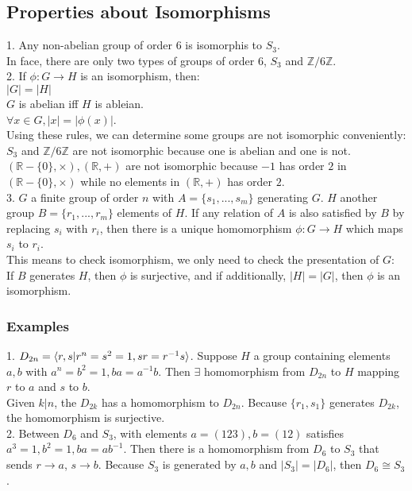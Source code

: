 \documentclass{article}
\begin{document}
\subsection{Properties about Isomorphisms}
\begin{addmargin}[1em]{0em}
1. Any non-abelian group of order $6$ is isomorphis to $S_3$.\\
In face, there are only two types of groups of order $6$, $S_3$ and $\mathbb{Z}/6\mathbb{Z}$.\\
2. If $\phi: G \rightarrow H$ is an isomorphism, then:\\
$|G| = |H|$\\
$G$ is abelian iff $H$ is ableian.\\
$\forall x \in G, |x| = |\phi(x)|$.\\
Using these rules, we can determine some groups are not isomorphic conveniently:\\
$S_3$ and $\mathbb{Z}/6\mathbb{Z}$ are not isomorphic because one is abelian and one is not.\\
$(\mathbb{R}-\{0\}, \times), (\mathbb{R}, +)$ are not isomorphic because $-1$ has order $2$ in $(\mathbb{R}-\{0\}, \times)$ while no elements in $(\mathbb{R}, +)$ has order $2$.\\
3. $G$ a finite group of order $n$ with $A=\{s_1, ..., s_m\}$ generating $G$. $H$ another group $B=\{r_1, ..., r_m\}$ elements of $H$. If any relation of $A$ is also satisfied by $B$ by replacing $s_i$ with $r_i$, then there is a unique homomorphism $\phi:G \rightarrow H$ which maps $s_i$ to $r_i$.\\
This means to check isomorphism, we only need to check the presentation of $G$:\\
If $B$ generates $H$, then $\phi$ is surjective, and if additionally, $|H| = |G|$, then $\phi$ is an isomorphism.\\
\subsubsection{Examples}
1. $D_{2n} = \braket{r,s|r^n=s^2=1, sr=r^{-1}s}$. Suppose $H$ a group containing elements $a,b$ with $a^n=b^2=1,ba=a^{-1}b$. Then $\exists$ homomorphism from $D_{2n}$ to $H$ mapping $r$ to $a$ and $s$ to $b$.\\
Given $k|n$, the $D_{2k}$ has a homomorphism to $D_{2n}$. Because $\{r_1, s_1\}$ generates $D_{2k}$, the homomorphism is surjective.\\
2. Between $D_6$ and $S_3$, with elements $a=(1 2 3), b=(1 2)$ satisfies $a^3 = 1, b^2 = 1, ba=ab^{-1}$. Then there is a homomorphism from $D_6$ to $S_3$ that sends $r \rightarrow a$, $s \rightarrow b$. Because $S_3$ is generated by $a, b$ and $|S_3| = |D_6|$, then $D_6 \cong S_3$.
\end{addmargin}
\end{document}
